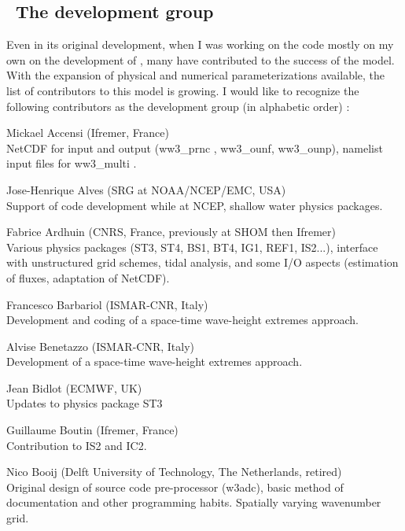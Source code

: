 \vssub
\subsection{~The development group}
\vssub

Even in its original development, when I was working on the code mostly on my
own on the development of \ws, many have contributed to the success of the
model. With the expansion of physical and numerical parameterizations
available, the list of contributors to this model is growing. I would like to
recognize the following contributors as the development group (in alphabetic
order) :

\begin{list}{\ldots}{ }

\item [Mickael Accensi] (Ifremer, France) \\
  NetCDF for input and output (ww3\_prnc , ww3\_ounf, ww3\_ounp), namelist input files for ww3\_multi .

\item [Jose-Henrique Alves] (SRG at NOAA/NCEP/EMC, USA) \\
  Support of code development while at NCEP, shallow water physics packages.

\item [Fabrice Ardhuin] (CNRS, France, previously at SHOM then Ifremer) \\
  Various physics packages (ST3, ST4, BS1, BT4, IG1, REF1, IS2...), interface with unstructured grid schemes, tidal analysis, and some I/O aspects (estimation of fluxes, adaptation of NetCDF). 
\item [Francesco Barbariol] (ISMAR-CNR, Italy) \\
  Development and coding of a space-time wave-height extremes approach.

\item [Alvise Benetazzo] (ISMAR-CNR, Italy) \\
  Development of a space-time wave-height extremes approach.

\item [Jean Bidlot] (ECMWF, UK) \\
  Updates to physics package ST3

\item [Guillaume Boutin] (Ifremer, France) \\
  Contribution to IS2 and IC2. 

  \item [Nico Booij] (Delft University of Technology, The Netherlands, retired) \\
  Original design of source code pre-processor ({\code w3adc}), basic method
  of documentation and other programming habits. Spatially varying wavenumber
  grid.


\end{list}
